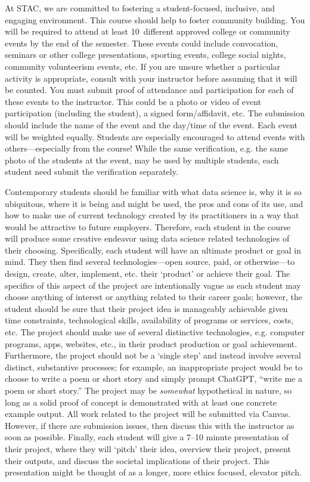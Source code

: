\documentclass[11pt,letterpaper]{article}
\begin{document}
At STAC, we are committed to fostering a student-focused, inclusive, and engaging environment. This course should help to foster community building. You will be required to attend at least 10~different approved college or community events by the end of the semester. These events could include convocation, seminars or other college presentations, sporting events, college social nights, community volunteerism events, etc. If you are unsure whether a particular activity is appropriate, consult with your instructor before assuming that it will be counted. You must submit proof of attendance and participation for each of these events to the instructor. This could be a photo or video of event participation (including the student), a signed form/affidavit, etc. The submission should include the name of the event and the day/time of the event. Each event will be weighted equally. Students are especially encouraged to attend events with others---especially from the course! While the same verification, e.g. the same photo of the students at the event, may be used by multiple students, each student need submit the verification separately. \pspace


Contemporary students should be familiar with what data science is, why it is so ubiquitous, where it is being and might be used, the pros and cons of its use, and how to make use of current technology created by its practitioners in a way that would be attractive to future employers. Therefore, each student in the course will produce some creative endeavor using data science related technologies of their choosing. Specifically, each student will have an ultimate product or goal in mind. They then find several technologies---open source, paid, or otherwise---to design, create, alter, implement, etc. their `product' or achieve their goal. The specifics of this aspect of the project are intentionally vague as each student may choose anything of interest or anything related to their career goals; however, the student should be sure that their project idea is manageably achievable given time constraints, technological skills, availability of programs or services, costs, etc. The project should make use of several distinctive technologies, e.g. computer programs, apps, websites, etc., in their product production or goal achievement. Furthermore, the project should not be a `single step' and instead involve several distinct, substantive processes; for example, an inappropriate project would be to choose to write a poem or short story and simply prompt ChatGPT, ``write me a poem or short story.'' The project may be \textit{somewhat} hypothetical in nature, so long as a solid proof of concept is demonstrated with at least one concrete example output. All work related to the project will be submitted via Canvas. However, if there are submission issues, then discuss this with the instructor as soon as possible. Finally, each student will give a 7--10 minute presentation of their project, where they will `pitch' their idea, overview their project, present their outputs, and discuss the societal implications of their project. This presentation might be thought of as a longer, more ethics focused, elevator pitch. \pspace
\end{document}
